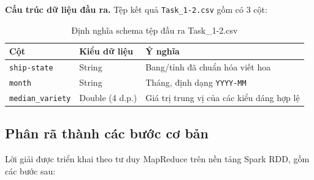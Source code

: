 \textbf{Cấu trúc dữ liệu đầu ra.} Tệp kết quả \texttt{Task\_1-2.csv} gồm có 3 cột:

\begin{table}[H]
\centering
\begin{tabular}{lll}
\toprule
\textbf{Cột} & \textbf{Kiểu dữ liệu} & \textbf{Ý nghĩa} \\
\midrule
\texttt{ship-state} & String & Bang/tỉnh đã chuẩn hóa viết hoa \\
\texttt{month} & String & Tháng, định dạng \texttt{YYYY-MM} \\
\texttt{median\_variety} & Double (4 d.p.) & Giá trị trung vị của các kiểu dáng hợp lệ \\
\bottomrule
\end{tabular}
\caption{Định nghĩa schema tệp đầu ra Task\_1-2.csv}
\label{tab:task1_2_schema}
\end{table}

\subsection{Phân rã thành các bước cơ bản}
Lời giải được triển khai theo tư duy MapReduce trên nền tảng Spark RDD, gồm các bước sau:

